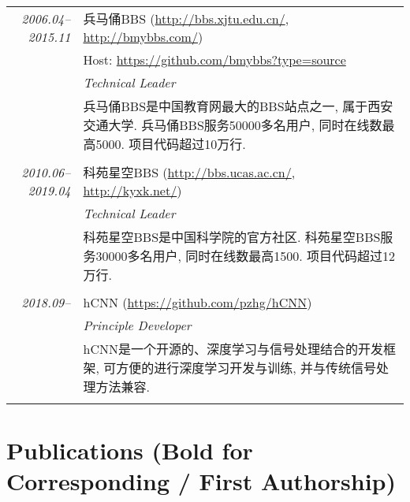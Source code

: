 \documentclass[paper=a4,fontsize=11pt]{scrartcl}
\begin{document}
\begin{longtable}{r|p{11cm}}
	\emph{2006.04--2015.11} & 兵马俑BBS (\href{http://bbs.xjtu.edu.cn/}{http://bbs.xjtu.edu.cn/}, \href{http://bmybbs.com/}{http://bmybbs.com/}) \\
	& Host: \href{https://github.com/bmybbs?type=source}{https://github.com/bmybbs?type=source} \\
	& \emph{Technical Leader} \\ 
	& \footnotesize{兵马俑BBS是中国教育网最大的BBS站点之一, 属于西安交通大学. 兵马俑BBS服务50000多名用户, 同时在线数最高5000. 项目代码超过10万行.}\\
	\multicolumn{2}{c}{} \\
	
	\emph{2010.06--2019.04} & 科苑星空BBS (\href{http://bbs.ucas.ac.cn/}{http://bbs.ucas.ac.cn/}, \href{http://kyxk.net/}{http://kyxk.net/}) \\
	& \emph{Technical Leader} \\ 
	& \footnotesize{科苑星空BBS是中国科学院的官方社区. 科苑星空BBS服务30000多名用户, 同时在线数最高1500. 项目代码超过12万行.}\\
	\multicolumn{2}{c}{} \\
	
	\emph{2018.09--} & hCNN (\href{https://github.com/pzhg/hCNN}{https://github.com/pzhg/hCNN}) \\
	& \emph{Principle Developer} \\ 
	& \footnotesize{hCNN是一个开源的、深度学习与信号处理结合的开发框架, 可方便的进行深度学习开发与训练, 并与传统信号处理方法兼容.}\\
	\multicolumn{2}{c}{} 
	
\end{longtable}



\section*{Publications (Bold for Corresponding / First Authorship)}

%
%
\end{document}
